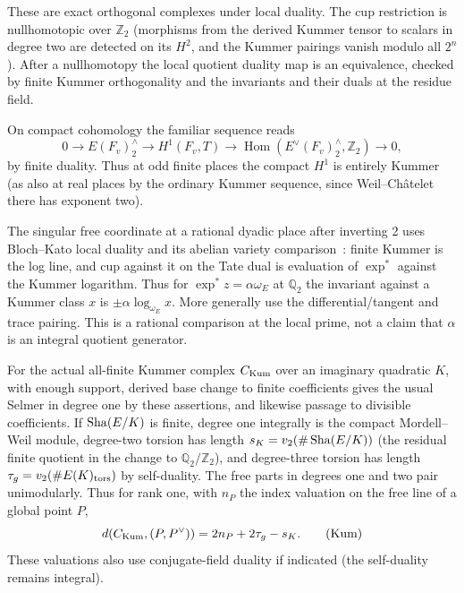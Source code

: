 These are exact orthogonal complexes under local duality. The cup restriction is nullhomotopic over \(\mathbb Z_2\) (morphisms from the derived Kummer tensor to scalars in degree two are detected on its \(H^2\), and the Kummer pairings vanish modulo all \(2^n\)). After a nullhomotopy the local quotient duality map is an equivalence, checked by finite Kummer orthogonality and the invariants and their duals at the residue field. 

On compact cohomology the familiar sequence reads
\[
 0\longrightarrow E(F_v)^\wedge_2\longrightarrow H^1(F_v,T)
           \longrightarrow\operatorname{Hom}(E^\vee(F_v)^\wedge_2,\mathbb Z_2)
                      \longrightarrow0,
\]
by finite duality. Thus at odd finite places the compact \(H^1\) is entirely Kummer (as also at real places by the ordinary Kummer sequence, since Weil--Châtelet there has exponent two). 

The singular free coordinate at a rational dyadic place after inverting 2 uses Bloch--Kato local duality and its abelian variety comparison~\cite[Sections~3.7--3.11]{BlochKato90}: finite Kummer is the log line, and cup against it on the Tate dual is evaluation of \(\exp^*\) against the Kummer logarithm. Thus for \(\exp^*z=\alpha\omega_E\) at \(\mathbb Q_2\) the invariant against a Kummer class \(x\) is \(\pm\alpha\log_{\omega_E}x\). More generally use the differential/tangent and trace pairing. This is a rational comparison at the local prime, not a claim that \(\alpha\) is an integral quotient generator.

\begin{lemma}\label{lem:foundations-kummer}
For the actual all-finite Kummer complex \(C_{\rm Kum}\) over an imaginary quadratic \(K\), with enough support, derived base change to finite coefficients gives the usual Selmer in degree one by these assertions, and likewise passage to divisible coefficients. If \(\operatorname{Sha}(E/K)\) is finite, degree one integrally is the compact Mordell--Weil module, degree-two torsion has length \(s_K=v_2(\#\operatorname{Sha}(E/K))\) (the residual finite quotient in the change to \(\mathbb Q_2/\mathbb Z_2\)), and degree-three torsion has length \(\tau_g=v_2(\#E(K)_{\rm tors})\) by self-duality. The free parts in degrees one and two pair unimodularly. Thus for rank one, with \(n_P\) the index valuation on the free line of a global point \(P\),
\[
               d(C_{\rm Kum},(P,P^\vee))=2n_P+2\tau_g-s_K.          \tag{Kum}\label{eq:Kum}
\]
These valuations also use conjugate-field duality if indicated (the self-duality remains integral).
\end{lemma}

